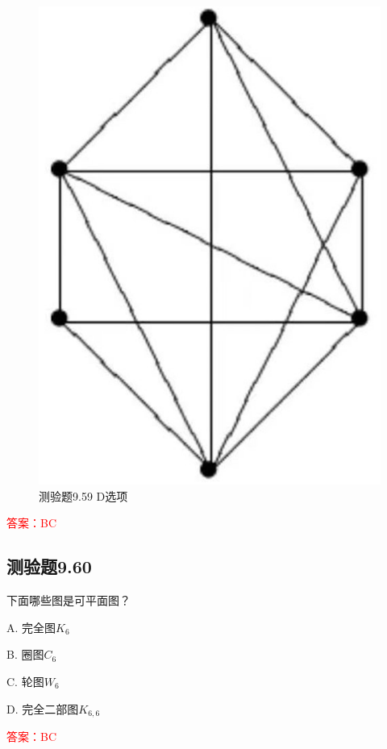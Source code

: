 \documentclass[UTF8, heading=true]{ctexart}
\begin{document}
\begin{figure}[H]
\begin{minipage}[t]{0.26\textwidth}
      \includegraphics[width=1\textwidth]{9.59_4.jpg} %
      \vspace{-0.3cm}
      \caption{测验题9.59 D选项}
\end{minipage}
\end{figure}

\textcolor{red}{答案：BC}

\subsection{测验题9.60}

下面哪些图是可平面图？

A. 完全图$K_6$

B. 圈图$C_6$

C. 轮图$W_6$

D. 完全二部图$K_{6,6} $

\textcolor{red}{答案：BC}
\end{document}
